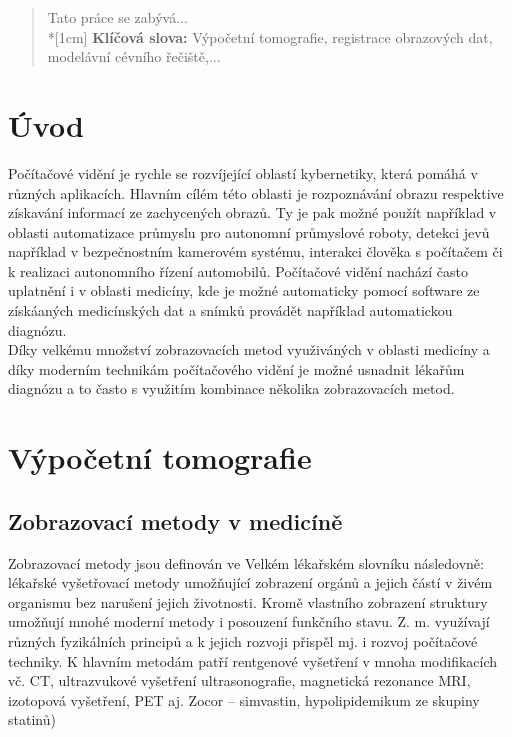 \documentclass{thesis}%
\begin{document}
\begin{abstract}
Tato práce se zabývá...\\*[1cm]
\textbf{Klíčová slova:} Výpočetní tomografie, registrace obrazových dat, modelávní cévního řečiště,...


\end{abstract}

\tableofcontents
\newpage

\chapter{Úvod}
Počítačové vidění je rychle se rozvíjející oblastí kybernetiky, která pomáhá v různých aplikacích. Hlavním cílém této oblasti je rozpoznávání obrazu respektive získavání informací ze zachycených obrazů.
Ty je pak možné použít například v oblasti automatizace průmyslu pro autonomní průmyslové roboty, detekci jevů například v bezpečnostním kamerovém systému, interakci člověka s počítačem či k realizaci
autonomního řízení automobilů. Počítačové vidění nachází často uplatnění i v oblasti medicíny, kde je možné automaticky pomocí software ze získáaných medicínských dat a snímků provádět například automatickou
diagnózu.\\
Díky velkému množství zobrazovacích metod využiváných v oblasti medicíny a díky moderním technikám počítačového vidění je možné usnadnit lékařům diagnózu a to často s využitím kombinace několika
zobrazovacích metod.\\

\chapter{Výpočetní tomografie}
\section{Zobrazovací metody v medicíně}
Zobrazovací metody jsou definován ve Velkém lékařském slovníku následovně:
lékařské vyšetřovací metody umožňující zobrazení orgánů a jejich částí v živém organismu bez narušení jejich životnosti. Kromě vlastního zobrazení struktury umožňují mnohé moderní metody i posouzení funkčního stavu. Z. m. využívají různých fyzikálních principů a k jejich rozvoji přispěl mj. i rozvoj počítačové techniky. K hlavním metodám patří rentgenové vyšetření v mnoha modifikacích vč. CT, ultrazvukové vyšetření ultrasonografie, magnetická rezonance MRI, izotopová vyšetření, PET aj. Zocor – simvastin, hypolipidemikum ze skupiny statinů)\cite{hugo}\\
\end{document}
